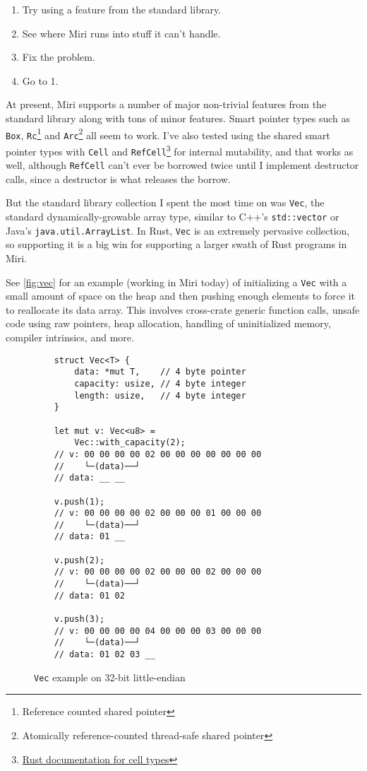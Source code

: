 \documentclass[twocolumn]{article}
\newcommand{\rust}[1]{\texttt{#1}}
\begin{document}
\begin{enumerate}
  \item Try using a feature from the standard library.
  \item See where Miri runs into stuff it can't handle.
  \item Fix the problem.
  \item Go to 1.
\end{enumerate}

At present, Miri supports a number of major non-trivial features from the standard library along
with tons of minor features. Smart pointer types such as \rust{Box}, \rust{Rc}\footnote{Reference
counted shared pointer} and \rust{Arc}\footnote{Atomically reference-counted thread-safe shared
pointer} all seem to work. I've also tested using the shared smart pointer types with \rust{Cell}
and \rust{RefCell}\footnote{\href{https://doc.rust-lang.org/stable/std/cell/index.html}{Rust
documentation for cell types}} for internal mutability, and that works as well, although
\rust{RefCell} can't ever be borrowed twice until I implement destructor calls, since a destructor
is what releases the borrow.

But the standard library collection I spent the most time on was \rust{Vec}, the standard
dynamically-growable array type, similar to C++'s \texttt{std::vector} or Java's
\texttt{java.util.ArrayList}. In Rust, \rust{Vec} is an extremely pervasive collection, so
supporting it is a big win for supporting a larger swath of Rust programs in Miri.

See \autoref{fig:vec} for an example (working in Miri today) of initializing a \rust{Vec} with a
small amount of space on the heap and then pushing enough elements to force it to reallocate its
data array. This involves cross-crate generic function calls, unsafe code using raw pointers, heap
allocation, handling of uninitialized memory, compiler intrinsics, and more.

\begin{figure}[t]
  \begin{verbatim}
    struct Vec<T> {
        data: *mut T,    // 4 byte pointer
        capacity: usize, // 4 byte integer
        length: usize,   // 4 byte integer
    }

    let mut v: Vec<u8> =
        Vec::with_capacity(2);
    // v: 00 00 00 00 02 00 00 00 00 00 00 00
    //    └─(data)──┘
    // data: __ __

    v.push(1);
    // v: 00 00 00 00 02 00 00 00 01 00 00 00
    //    └─(data)──┘
    // data: 01 __

    v.push(2);
    // v: 00 00 00 00 02 00 00 00 02 00 00 00
    //    └─(data)──┘
    // data: 01 02

    v.push(3);
    // v: 00 00 00 00 04 00 00 00 03 00 00 00
    //    └─(data)──┘
    // data: 01 02 03 __
  \end{verbatim}
  \caption{\rust{Vec} example on 32-bit little-endian}
  \label{fig:vec}
\end{figure}
\end{document}

